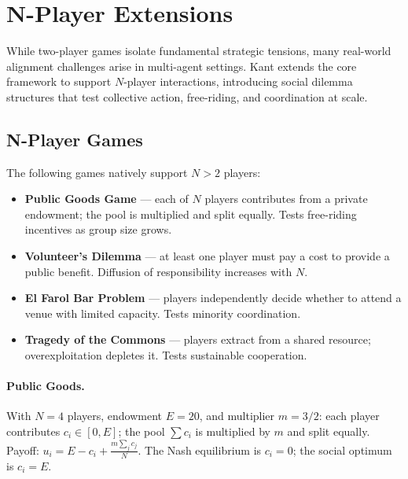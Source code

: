 
\section{N-Player Extensions}
\label{sec:nplayer}

While two-player games isolate fundamental strategic tensions, many real-world
alignment challenges arise in multi-agent settings. Kant extends the core
framework to support $N$-player interactions, introducing social dilemma
structures that test collective action, free-riding, and coordination at scale.


\subsection{N-Player Games}
\label{sec:nplayer-games}

The following games natively support $N > 2$ players:

\begin{itemize}[nosep]
    \item \textbf{Public Goods Game} --- each of $N$ players contributes from
          a private endowment; the pool is multiplied and split equally.
          Tests free-riding incentives as group size grows.
    \item \textbf{Volunteer's Dilemma} --- at least one player must pay a cost
          to provide a public benefit. Diffusion of responsibility increases
          with $N$.
    \item \textbf{El Farol Bar Problem} --- players independently decide whether
          to attend a venue with limited capacity. Tests minority coordination.
    \item \textbf{Tragedy of the Commons} --- players extract from a shared
          resource; overexploitation depletes it. Tests sustainable cooperation.
\end{itemize}

\paragraph{Public Goods.} With $N=4$ players, endowment $E=20$, and
multiplier $m = 3/2$: each player contributes $c_i \in [0, E]$; the pool
$\sum c_i$ is multiplied by $m$ and split equally. Payoff:
$u_i = E - c_i + \frac{m \sum_j c_j}{N}$. The Nash equilibrium is
$c_i = 0$; the social optimum is $c_i = E$.


